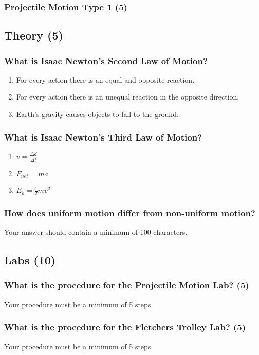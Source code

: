 \documentclass{article}
\begin{document}
\subsubsection{Projectile Motion Type 1 (5)}

\subsection{Theory (5)}
\subsubsection{What is Isaac Newton's Second Law of Motion?}
\begin{enumerate}[label=\alph*)]
    \item For every action there is an equal and opposite reaction.
    \item For every action there is an unequal reaction in the opposite direction.
    \item Earth's gravity causes objects to fall to the ground.
\end{enumerate}
\subsubsection{What is Isaac Newton's Third Law of Motion?}
\begin{enumerate}[label=\alph*)]
    \item $v = \frac{\Delta d}{\Delta t}$
    \item $F_{net} = ma$
    \item $E_{k} = \frac{1}{2}mv^2$
\end{enumerate}


\subsubsection{How does uniform motion differ from non-uniform motion?}
Your answer should contain a minimum of 100 characters.

\subsection{Labs (10)}
\subsubsection{What is the procedure for the Projectile Motion Lab? (5)}
Your procedure must be a minimum of 5 steps.
\subsubsection{What is the procedure for the Fletchers Trolley Lab? (5)}
Your procedure must be a minimum of 5 steps.\\
\end{document}
